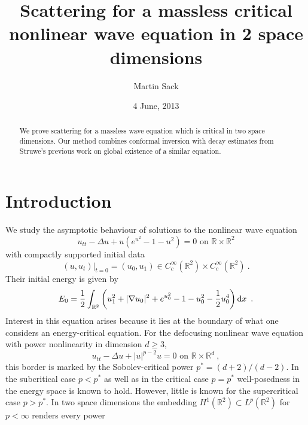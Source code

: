 \documentclass[a4paper]{amsart}
\title[Scattering for massless critical wave equation]{Scattering for a
massless critical nonlinear wave equation in 2 space dimensions}
\author{Martin Sack}
\date{4 June, 2013}
\providecommand{\abs}[1]{\lvert #1 \rvert}
\providecommand{\dint}[1]{ {\rm d} #1\,}
\begin{document}
\begin{abstract}
  We prove scattering for a massless wave equation which is critical
  in two space dimensions. Our method combines conformal inversion
  with decay estimates from Struwe's previous work on global existence
  of a similar equation.
\end{abstract}

\maketitle

\section{Introduction}

We study the asymptotic behaviour of solutions to the nonlinear wave equation
\begin{equation}
  u_{tt}
  -
  \Delta u
  +
  u
  (e^{u^2} - 1 - u^2)
  =
  0
  \text{ on }
  {\mathbb{R}} \times {\mathbb{R}}^2
  \label{eq:nleqwomass}
\end{equation}
with compactly supported initial data
\begin{equation}
  (u,u_t)\vert_{t = 0}
  =
  (u_0,u_1)
  \in
  C_c^\infty(\mathbb{R}^2)
  \times
  C_c^\infty(\mathbb{R}^2)
  \label{eq:cauchydata}
  \ .
\end{equation}
Their initial energy is given by
\begin{equation}
  E_0
  =
  \frac{1}{2}
  \int_{\mathbb{R}^2}
  \left(
    u_1^2
    +
    \abs{\nabla u_0}^2
    +
    e^{u_0^2} - 1 - u_0^2 - \frac{1}{2} u_0^4
  \right)
  \dint{x}
  \ .
  \label{eq:energy}
\end{equation}
Interest in this equation arises because it lies at the boundary of
what one considers an energy-critical equation.
For the defocusing nonlinear wave equation with power nonlinearity in
dimension $d \geq 3$,
\begin{equation*}
  u_{tt}
  -
  \Delta u
  +
  \abs{u}^{p - 2}
  u
  =
  0
  \text{ on }
  {\mathbb{R}} \times {\mathbb{R}}^d
  \ ,
\end{equation*}
this border is marked by the Sobolev-critical power $p^{*} =
(d + 2) / (d - 2)$. In the subcritical case $p < p^{*}$ as well as in
the critical case $p = p^{*}$ well-posedness in the energy space is
known to hold.
However, little is known for the supercritical case $p > p^{*}$.
In two space dimensions the embedding $H^1(\mathbb{R}^2) \subset
L^p(\mathbb{R}^2)$ for $p < \infty$ renders every power
\end{document}
